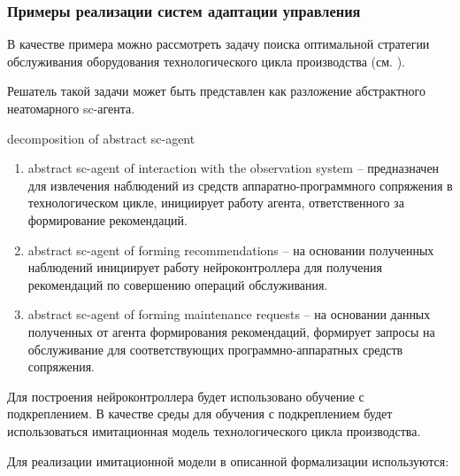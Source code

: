 \subsubsection{Примеры реализации систем адаптации управления}

В качестве примера можно рассмотреть задачу поиска оптимальной стратегии обслуживания оборудования технологического цикла производства (см. ).

Решатель такой задачи может быть представлен как разложение абстрактного неатомарного sc-агента.

\begin{SCn}
\begin{scnrelfromset}{decomposition of abstract sc-agent}
\end{scnrelfromset}
\end{SCn}

\begin{enumerate}
    \item abstract sc-agent of interaction with the observation system – предназначен для извлечения наблюдений из средств аппаратно-программного сопряжения в технологическом цикле, инициирует работу агента, ответственного за формирование рекомендаций.
    \item abstract sc-agent of forming recommendations – на основании полученных наблюдений инициирует работу нейроконтроллера для получения рекомендаций по совершению операций обслуживания.
    \item abstract sc-agent of forming maintenance requests – на основании данных полученных от агента формирования рекомендаций, формирует запросы на обслуживание для соответствующих программно-аппаратных средств сопряжения.

\end{enumerate}

Для построения нейроконтроллера будет использовано обучение с подкреплением. В качестве среды для обучения с подкреплением будет использоваться имитационная модель технологического цикла производства.

Для реализации имитационной модели в описанной формализации используются:




